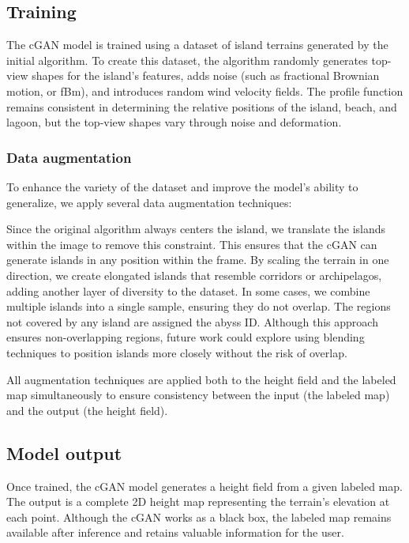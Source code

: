\subsection{Training}

The cGAN model is trained using a dataset of island terrains generated by the initial algorithm. To create this dataset, the algorithm randomly generates top-view shapes for the island's features, adds noise (such as fractional Brownian motion, or fBm), and introduces random wind velocity fields. The profile function remains consistent in determining the relative positions of the island, beach, and lagoon, but the top-view shapes vary through noise and deformation.

\subsubsection{Data augmentation}

To enhance the variety of the dataset and improve the model's ability to generalize, we apply several data augmentation techniques:
\begin{Itemize}
     Since the original algorithm always centers the island, we translate the islands within the image to remove this constraint. This ensures that the cGAN can generate islands in any position within the frame.
     By scaling the terrain in one direction, we create elongated islands that resemble corridors or archipelagos, adding another layer of diversity to the dataset.
     In some cases, we combine multiple islands into a single sample, ensuring they do not overlap. The regions not covered by any island are assigned the abyss ID. Although this approach ensures non-overlapping regions, future work could explore using blending techniques to position islands more closely without the risk of overlap.
\end{Itemize}

All augmentation techniques are applied both to the height field and the labeled map simultaneously to ensure consistency between the input (the labeled map) and the output (the height field).

\subsection{Model output}

Once trained, the cGAN model generates a height field from a given labeled map. The output is a complete 2D height map representing the terrain's elevation at each point. Although the cGAN works as a black box, the labeled map remains available after inference and retains valuable information for the user.

